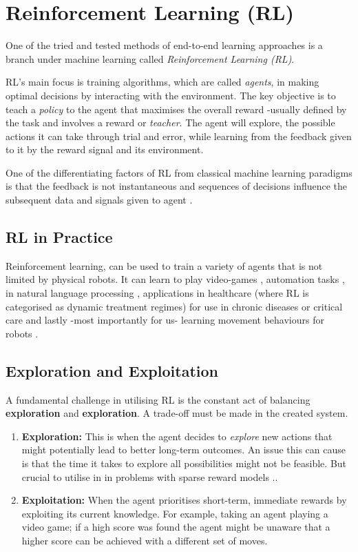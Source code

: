 \section{Reinforcement Learning (RL)}
\label{sec:rl}
  One of the tried and tested methods of end-to-end learning approaches is a branch under machine learning called \emph{Reinforcement Learning (RL)}. 


  RL's main focus is training algorithms, which are called \emph{agents}, in making optimal decisions by interacting with the environment. The key objective is to teach a \emph{policy} to the agent that maximises the overall reward -usually defined by the task and involves a reward or \emph{teacher}. The agent will explore, the possible actions it can take through trial and error, while learning from the feedback given to it by the reward signal and its environment.

  One of the differentiating factors of RL from classical machine learning paradigms is that the feedback is not instantaneous and sequences of decisions influence the subsequent data and signals given to agent \cite{silver2015}.

\subsection{RL in Practice}
  Reinforcement learning, can be used to train a variety of agents that is not limited by physical robots. It can learn to play video-games \cite{comi2018}, automation tasks \cite{} , in natural language processing \cite{paulus2017deepreinforcedmodelabstractive}, applications in healthcare (where RL is categorised as dynamic treatment regimes) for use in chronic diseases or critical care \cite{yu2020reinforcementlearninghealthcaresurvey} and lastly -most importantly for us- learning movement behaviours for robots \cite{}.

  \subsection{Exploration and Exploitation}
  
  A fundamental challenge in utilising RL is the constant act of balancing \textbf{exploration} and \textbf{exploration}. A trade-off must be made in the created system.
  \begin{enumerate}
    \item \textbf{Exploration:}
    This is when the agent decides to \emph{explore} new actions that might potentially lead to better long-term outcomes. An issue this can cause is that the time it takes to explore all possibilities might not be feasible. But crucial to utilise in in problems with sparse reward models \cite{}..
    \item \textbf{Exploitation:}
    When the agent prioritises short-term, immediate rewards by exploiting its current knowledge. For example, taking an agent playing a video game; if a high score was found the agent might be unaware that a higher score can be achieved with a different set of moves. 
  \end{enumerate}

